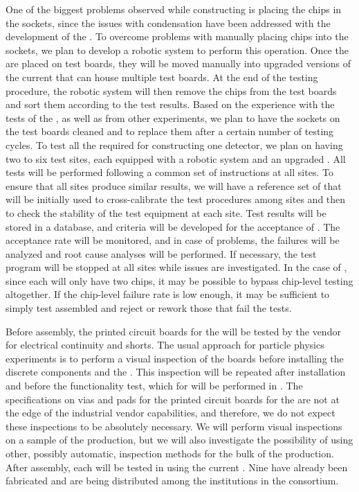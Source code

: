One of the biggest problems observed while constructing
 is placing the chips in
the sockets, since the issues with condensation
have been addressed with the development of the .
To overcome problems with manually placing chips into
the sockets, we plan to develop a robotic system
to perform this operation. Once the  are 
placed on test boards, they will be moved manually into 
upgraded versions of the current  that can
house multiple test boards. At the end of the testing
procedure, the robotic system will then remove
the chips from the test boards and sort them according to
the test results. Based on the experience with the tests of
the  , as well as from other experiments,
we plan to have the sockets on the 
test boards cleaned and to replace them after a certain number of
testing cycles. To test all the  required for
constructing one  detector, we plan on having two to six test sites, each equipped with a
robotic system and an upgraded . All tests
will be performed following a common set of instructions
at all sites. To ensure that all sites produce similar
results, we will have a reference set of 
that will be initially used to cross-calibrate the 
test procedures among sites and then to check the 
stability of the test equipment at each site. Test results will
be stored in a database, and criteria will be developed
for the acceptance of . The acceptance rate 
will be monitored, and in case of problems,
the failures will be analyzed and root cause analyses
will be performed. If necessary, the test program will be stopped
at all sites while issues are investigated. In the case of ,
since each  will only have two chips, it may be possible to bypass
chip-level testing altogether.  If the chip-level failure rate is low enough,
it may be sufficient to simply test assembled  and reject or rework
those that fail the tests.

Before assembly, the printed circuit boards for the
 will be tested by the vendor for electrical
continuity and shorts. The usual approach for particle physics
experiments is to perform a visual inspection of the boards
before installing the discrete components and 
the . This inspection will be repeated after 
installation and before the functionality test, which for  will
be performed in \lntwo. The specifications on vias and pads for the printed
circuit boards for the  are not at the edge of the
industrial vendor capabilities, and therefore, we do not
expect these inspections to be absolutely necessary. We will
perform visual inspections on a sample of the 
production, but we will also investigate the possibility
of using other, possibly automatic, inspection methods for
the bulk of the production. After assembly, 
each  will be tested in \lntwo using
the current . Nine  have already been
fabricated and are being distributed among the institutions
in the consortium. 

